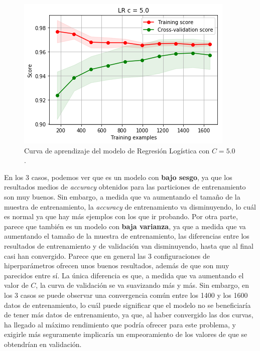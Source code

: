 \documentclass[11pt,a4paper]{article}
\begin{document}
\begin{figure}[H]
    \centering
    \includegraphics[scale=0.5]{img/lc-lr-c-5.png}
    \caption{Curva de aprendizaje del modelo de Regresión Logística con $C=5.0$.}
    \label{fig:lc-lr-c-5}
\end{figure}

En los 3 casos, podemos ver que es un modelo con \textbf{bajo sesgo}, ya que los resultados medios de \textit{accuracy} obtenidos para las particiones de
entrenamiento son muy buenos. Sin embargo, a medida que va aumentando el tamaño de la muestra de entrenamiento, la \textit{accuracy} de entrenamiento
va disminuyendo, lo cuál es normal ya que hay más ejemplos con los que ir probando. Por otra parte, parece que también es un modelo con \textbf{baja
varianza}, ya que a medida que va aumentando el tamaño de la muestra de entrenamiento, las diferencias entre los resultados de entrenamiento y de validación
van disminuyendo, hasta que al final casi han convergido. Parece que en general las 3 configuraciones de hiperparámetros ofrecen unos buenos
resultados, además de que son muy parecidos entre sí. La única diferencia es que, a medida que va aumentando el valor de $C$, la curva de validación
se va suavizando más y más. Sin embargo, en los 3 casos se puede observar una convergencia común entre los 1400 y los 1600 datos de entrenamiento,
lo cuál puede significar que el modelo no se beneficiaría de tener más datos de entrenamiento, ya que, al haber convergido las dos curvas, ha llegado
al máximo rendimiento que podría ofrecer para este problema, y exigirle más seguramente implicaría un empeoramiento de los valores de que se
obtendrían en validación.
\end{document}
